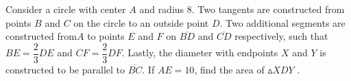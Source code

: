 Consider a circle with center $A$ and radius $8$. Two tangents are constructed from points $B$ and $C$ on the circle to an outside point $D$. Two additional segments are constructed from$ A$ to points $E$ and $F$ on  $\overline{BD}$ and  $\overline{CD}$ respectively, such that $BE = \dfrac{2}{3} DE$ and $CF = \dfrac{2}{3} DF$. Lastly, the diameter with endpoints $X$ and $Y$ is constructed to be parallel to $\overline{BC}$. If $AE = 10$, find the area of $\vartriangle XDY$ .
